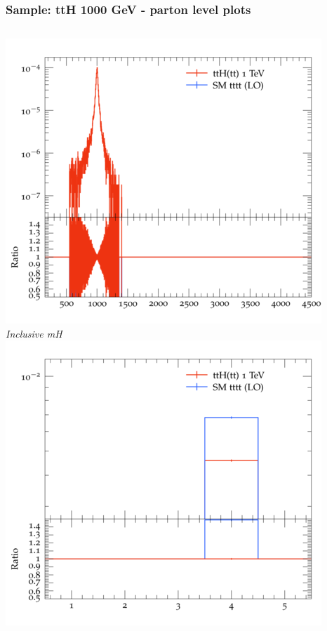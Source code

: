 \documentclass{beamer}
\begin{document}
\begin{frame}
\frametitle{Sample: ttH 1000 GeV - parton level plots}
\begin{columns}
\includegraphics[width=\textwidth]{../plots/ttH_1000/tttt_ttH/Inclusive_mH.png}\\
\textit{\small Inclusive mH}
\includegraphics[width=\textwidth]{../plots/ttH_1000/tttt_ttH/Inclusive_nTop.png}\\

\end{columns}
\end{frame}
\end{document}
